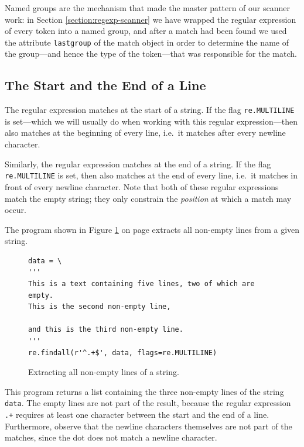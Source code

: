 \remarkEng
Named groups are the mechanism that made the master pattern of our scanner work: in Section
\ref{section:regexp-scanner} we have wrapped the regular expression of every token into a named group, and after a
match had been found we used the attribute \texttt{lastgroup} of the match object in order to determine the name
of the group---and hence the type of the token---that was responsible for the match.
\eox

\subsection{The Start and the End of a Line}
The regular expression \texttt{} matches at the start of a string.  If the flag \texttt{re.MULTILINE}
is set---which we will usually do when working with this regular expression---then \texttt{} also
matches at the beginning of every line, i.e.\ it matches after every newline character.

Similarly, the regular expression \texttt{} matches at the end of a string.  If the flag
\texttt{re.MULTILINE} is set, then \texttt{} also matches at the end of every line, i.e.\ it matches
in front of every newline character.  Note that both of these regular expressions match the empty string; they
only constrain the \emph{position} at which a match may occur.

The program shown in Figure \ref{fig:multiline.py} on page \pageref{fig:multiline.py} extracts all non-empty
lines from a given string.

\begin{figure}[!ht]
\centering
  \begin{verbatim}
data = \
'''
This is a text containing five lines, two of which are empty.
This is the second non-empty line,

and this is the third non-empty line.
'''
re.findall(r'^.+$', data, flags=re.MULTILINE)
\end{verbatim}
\vspace*{-0.3cm}
\caption{Extracting all non-empty lines of a string.}
\label{fig:multiline.py}
\end{figure}

\noindent
This program returns a list containing the three non-empty lines of the string \texttt{data}.  The empty lines
are not part of the result, because the regular expression \texttt{\symbol{94}.+\symbol{36}} requires at least
one character between the start and the end of a line.  Furthermore, observe that the newline characters
themselves are not part of the matches, since the dot does not match a newline character.

